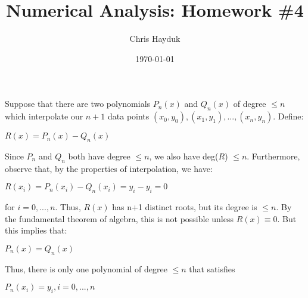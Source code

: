 \documentclass[12pt]{article}
\newenvironment{problem}[2][Problem]{\begin{trivlist}
\item[\hskip \labelsep {\bfseries #1}\hskip \labelsep {\bfseries #2.}]}{\end{trivlist}}
\begin{document}
\title{Numerical Analysis: Homework \#4}

\author{Chris Hayduk}
\date{\today}

\maketitle

\begin{problem}{1}
\end{problem}

\noindent Suppose that there are two polynomials $P_n(x)$ and $Q_n(x)$ of degree $\leq n$ which interpolate our $n+1$ data points $(x_0, y_0), (x_1, y_1), ..., (x_n, y_n)$. Define:
\begin{center}
$R(x) = P_n(x) - Q_n(x)$
\end{center}
Since $P_n$ and $Q_n$ both have degree $\leq n$, we also have deg($R$) $\leq n$. Furthermore, observe that, by the properties of interpolation, we have:
\begin{center}
$R(x_i) = P_n(x_i) - Q_n(x_i) = y_i - y_i = 0$
\end{center}
for $i = 0, ..., n$. Thus, $R(x)$ has n+1 distinct roots, but its degree is $\leq n$. By the fundamental theorem of algebra, this is not possible unless $R(x) \equiv 0$. But this implies that:
\begin{center}
$P_n(x) = Q_n(x)$
\end{center}
Thus, there is only one polynomial of degree $\leq n$ that satisfies
\begin{center}
$P_n(x_i) = y_i, i = 0, ..., n$
\end{center}

\begin{problem}{2}
\end{problem}
\end{document}
